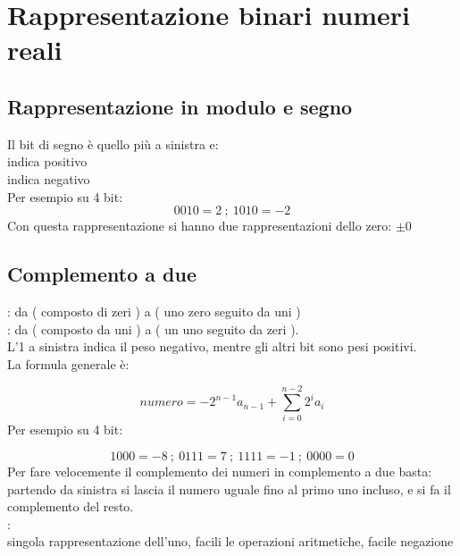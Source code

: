 \documentclass[arch.tex]{subfiles}
\begin{document}
\section{Rappresentazione binari numeri reali}

\subsection{Rappresentazione in modulo e segno}%
\label{sub:rappresentazione_in_modulo_e_segno}
Il bit di segno è quello più a sinistra e:\\
 indica positivo\\
 indica negativo\\
Per esempio su 4 bit:
\begin{equation}
	0010 = 2\ ;\ 1010 = -2
\end{equation}
Con questa rappresentazione si hanno due rappresentazioni dello zero: $ \pm 0 $ 

\subsection{Complemento a due}%
\label{sub:complemento_a_due}
: da  ( composto di  zeri ) a  
( uno zero seguito da  uni )\\
: da  ( composto da  uni ) a  
( un uno seguito da  zeri ).\\
L'1 a sinistra indica il peso negativo, mentre gli altri bit sono pesi positivi.\\
La formula generale è:

\begin{equation}
	numero = -2^{n-1} a_{n-1} + \sum_{i=0}^{n - 2} 2^i a_i
\end{equation}
Per esempio su 4 bit:

\begin{equation}
	1000 = -8\ ;\ 0111 = 7\ ;\ 1111 = -1\ ;\ 0000 = 0
\end{equation}
Per fare velocemente il complemento dei numeri in complemento a due basta:\\
partendo da sinistra si lascia il numero uguale fino al primo uno incluso, e si fa il 
complemento del resto.\\
:\\
singola rappresentazione dell'uno, facili le operazioni aritmetiche, facile negazione
\end{document}
